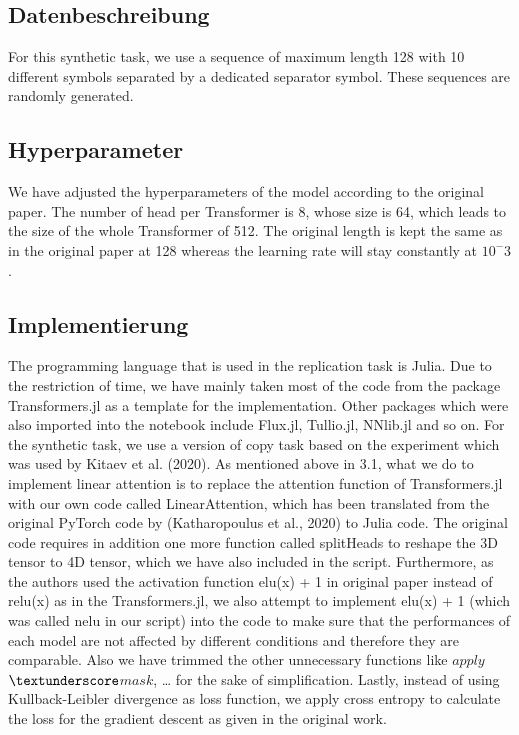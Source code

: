 \documentclass[DIV=13,fontsize=11pt]{scrartcl}
\begin{document}
\subsection{Datenbeschreibung}
For this synthetic task, we use a sequence of maximum length 128 with 10 different symbols separated by a dedicated separator symbol. These sequences are randomly generated.

\subsection{Hyperparameter}
We have adjusted the hyperparameters of the model according to the original paper. The number of head per Transformer is 8, whose size is 64, which leads to the size of the whole Transformer of 512. The original length is kept the same as in the original paper at 128 whereas the learning rate will stay constantly at \(10^-3\). 

\subsection{Implementierung}
The programming language that is used in the replication task is Julia. Due to the restriction of time, we have mainly taken most of the code from the package Transformers.jl as a template for the implementation. Other packages which were also imported into the notebook include Flux.jl, Tullio.jl, NNlib.jl and so on. For the synthetic task, we use a version of copy task based on the experiment which was used by Kitaev et al. (2020). As mentioned above in 3.1, what we do to implement linear attention is to replace the attention function of Transformers.jl with our own code called LinearAttention, which has been translated from the original PyTorch code by (Katharopoulus et al., 2020) to Julia code. The original code requires in addition one more function called splitHeads to reshape the 3D tensor to 4D tensor, which we have also included in the script. Furthermore, as the authors used the activation function elu(x) + 1 in original paper instead of relu(x) as in the Transformers.jl, we also attempt to implement elu(x) + 1 (which was called nelu in our script) into the code to make sure that the performances of each model are not affected by different conditions and therefore they are comparable. Also we have trimmed the other unnecessary functions like \(apply\)\(\textunderscore\)\(mask\), … for the sake of simplification. Lastly, instead of using Kullback-Leibler divergence as loss function, we apply cross entropy to calculate the loss for the gradient descent as given in the original work.
\end{document}
